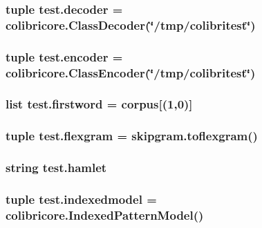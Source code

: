 \subsubsection[{decoder}]{\setlength{\rightskip}{0pt plus 5cm}tuple test.\+decoder = colibricore.\+Class\+Decoder(\char`\"{}/tmp/colibritest\char`\"{})}\label{namespacetest_a315e1f1cdf594ddd88b3c64ac5a8d8ea}
\hypertarget{namespacetest_abcc44abf2a2645b488cdf35706e3f8dd}{}
\subsubsection[{encoder}]{\setlength{\rightskip}{0pt plus 5cm}tuple test.\+encoder = colibricore.\+Class\+Encoder(\char`\"{}/tmp/colibritest\char`\"{})}\label{namespacetest_abcc44abf2a2645b488cdf35706e3f8dd}
\hypertarget{namespacetest_a5a126843bd3c37ec8975aee3d83d8728}{}
\subsubsection[{firstword}]{\setlength{\rightskip}{0pt plus 5cm}list test.\+firstword = {\bf corpus}\mbox{[}(1,0)\mbox{]}}\label{namespacetest_a5a126843bd3c37ec8975aee3d83d8728}
\hypertarget{namespacetest_a8933a99096108a0d9655a4c91eb38224}{}
\subsubsection[{flexgram}]{\setlength{\rightskip}{0pt plus 5cm}tuple test.\+flexgram = skipgram.\+toflexgram()}\label{namespacetest_a8933a99096108a0d9655a4c91eb38224}
\hypertarget{namespacetest_aa74f097103f43897cb329756acef4552}{}
\subsubsection[{hamlet}]{\setlength{\rightskip}{0pt plus 5cm}string test.\+hamlet}\label{namespacetest_aa74f097103f43897cb329756acef4552}
\hypertarget{namespacetest_a9d72ba48113d00bd5f59eec20845f71b}{}
\subsubsection[{indexedmodel}]{\setlength{\rightskip}{0pt plus 5cm}tuple test.\+indexedmodel = colibricore.\+Indexed\+Pattern\+Model()}\label{namespacetest_a9d72ba48113d00bd5f59eec20845f71b}
\hypertarget{namespacetest_a51ed4c3f6972c49e80c5c430c2d82153}{}
